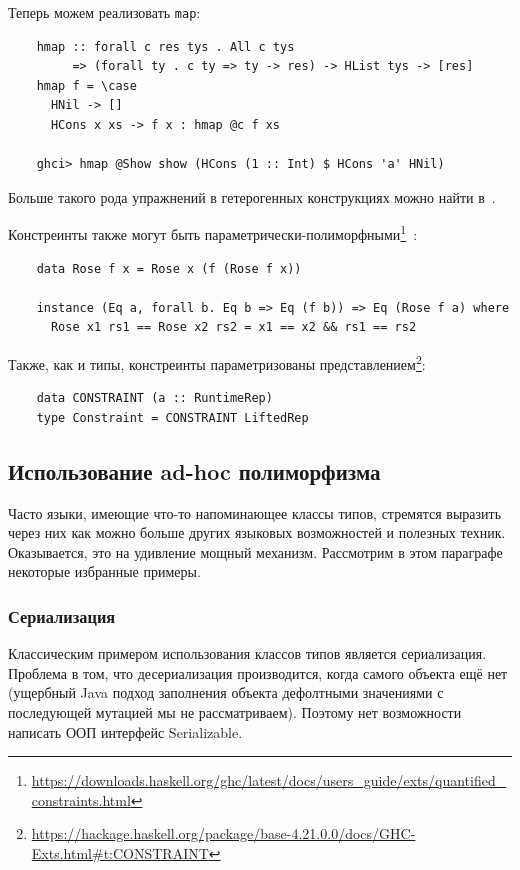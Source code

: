Теперь можем реализовать \texttt{map}:
\begin{verbatim}
    hmap :: forall c res tys . All c tys
         => (forall ty . c ty => ty -> res) -> HList tys -> [res]
    hmap f = \case
      HNil -> []
      HCons x xs -> f x : hmap @c f xs

    ghci> hmap @Show show (HCons (1 :: Int) $ HCons 'a' HNil)
\end{verbatim}

Больше такого рода упражнений в гетерогенных конструкциях можно найти в~\cite{de2014true}.

Констреинты также могут быть параметрически-полиморфными\footnote{\url{https://downloads.haskell.org/ghc/latest/docs/users_guide/exts/quantified_constraints.html}}~\cite{bottu2017quantified}:
\begin{verbatim}
    data Rose f x = Rose x (f (Rose f x))

    instance (Eq a, forall b. Eq b => Eq (f b)) => Eq (Rose f a) where
      Rose x1 rs1 == Rose x2 rs2 = x1 == x2 && rs1 == rs2
\end{verbatim}

Также, как и типы, констреинты параметризованы представлением\footnote{\url{https://hackage.haskell.org/package/base-4.21.0.0/docs/GHC-Exts.html\#t:CONSTRAINT}}: %
\begin{verbatim}
    data CONSTRAINT (a :: RuntimeRep)
    type Constraint = CONSTRAINT LiftedRep
\end{verbatim}

\subsection{Использование ad-hoc полиморфизма}

Часто языки, имеющие что-то напоминающее классы типов, стремятся выразить через них как можно больше других языковых возможностей и полезных техник.
Оказывается, это на удивление мощный механизм.
Рассмотрим в этом параграфе некоторые избранные примеры.

\subsubsection{Сериализация}

Классическим примером использования классов типов является сериализация.
Проблема в том, что десериализация производится, когда самого объекта ещё нет (ущербный Java подход заполнения объекта дефолтными значениями с последующей мутацией мы не рассматриваем).
Поэтому нет возможности написать ООП интерфейс Serializable.

